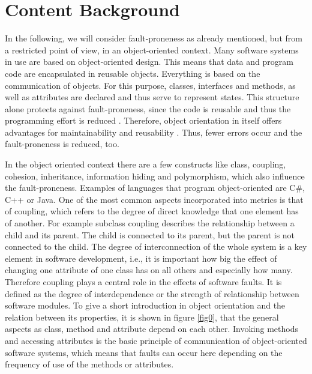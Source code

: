 \section{Content Background}\label{content}

In the following, we will consider fault-proneness as already mentioned, but from a restricted point of view, in an object-oriented context. Many software systems in use are based on object-oriented design. This means that data and program code are encapsulated in reusable objects. Everything is based on the communication of objects. For this purpose, classes, interfaces and methods, as well as attributes are declared and thus serve to represent states. This structure alone protects against fault-proneness, since the code is reusable and thus the programming effort is reduced \cite{fichman1993adoption}. Therefore, object orientation in itself offers advantages for maintainability and reusability \cite{lanza2002beyond}. Thus, fewer errors occur and the fault-proneness is reduced, too. 

In the object oriented context there are a few constructs like class, coupling, cohesion, inheritance, information hiding and polymorphism, which also influence the fault-proneness. Examples of languages that program object-oriented are C\#, C++ or Java.
One of the most common aspects incorporated into metrics is that of coupling, which refers to the degree of direct knowledge that one element has of another. For example subclass coupling describes the relationship between a child and its parent. The child is connected to its parent, but the parent is not connected to the child. 
The degree of interconnection of the whole system is a key element in software development, i.e., it is important how big the effect of changing one attribute of one class has on all others and especially how many.
Therefore coupling plays a central role in the effects of software faults. It is defined as the degree of interdependence or the strength of relationship between software modules.
To give a short introduction in object orientation and the relation between its properties, it is shown in figure \ref{fig0}, that the general aspects as class, method and attribute depend on each other. Invoking methods and accessing attributes is the basic principle of communication of object-oriented software systems, which means that faults can occur here depending on the frequency of use of the methods or attributes.

